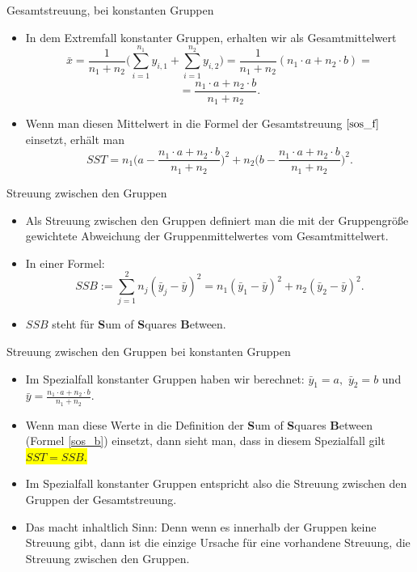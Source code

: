 \documentclass[usenames,dvipsnames,handout]{beamer}
\begin{document}
\begin{frame}{Gesamtstreuung, bei konstanten Gruppen}
\begin{itemize}
\item{In dem Extremfall konstanter Gruppen, erhalten wir als Gesamtmittelwert
 $$\bar{x}=\frac{1}{n_{1}+n_{2}} \bigg(\sum_{i=1}^{n_{1}} y_{i,1} + \sum_{i=1}^{n_{2}} y_{i,2}\bigg)
 =\frac{1}{n_{1}+n_{2}}(n_{1} \cdot a + n_{2} \cdot b) =$$ $$ = \frac{n_{1} \cdot a + n_{2} \cdot b}{n_{1}+n_{2}}.$$
}\pause
\item{Wenn man diesen Mittelwert in die Formel  der Gesamtstreuung $\eqref{sos_f}$  einsetzt, erhält man
\begin{equation}
\label{sos_t} SST=
n_{1}\bigg( a - \frac{n_{1} \cdot a + n_{2} \cdot b}{n_{1}+n_{2}}\bigg)^{2}+
n_{2}\bigg( b - \frac{n_{1} \cdot a + n_{2} \cdot b}{n_{1}+n_{2}}\bigg)^{2}.
\end{equation}
}
\end{itemize}
\end{frame}
\begin{frame}{Streuung zwischen den Gruppen}
\begin{itemize}
\item{Als Streuung zwischen den Gruppen definiert man die mit der Gruppengröße gewichtete Abweichung
der Gruppenmittelwertes vom Gesamtmittelwert.}\pause
\item{In einer Formel:
\begin{equation}
\label{sos_b} 
SSB := \sum_{j=1}^{2}n_{j}(\bar{y}_{j}-\bar{y})^{2}=n_{1}(\bar{y}_{1}-\bar{y})^{2}+
n_{2}(\bar{y}_{2}-\bar{y})^{2}.
\end{equation}
}\pause
\item{$SSB$ steht für \textbf{S}um of \textbf{S}quares \textbf{B}etween.}
\end{itemize}
\end{frame}


\begin{frame}{Streuung zwischen den Gruppen bei konstanten Gruppen}
\begin{itemize}
\item{Im Spezialfall konstanter Gruppen haben wir berechnet: $\bar{y}_{1}=a,$ $\bar{y}_{2}=b$ und 
$\bar{y}=\frac{n_{1} \cdot a + n_{2} \cdot b}{n_{1} + n_{2}}.$}\pause
\item{Wenn man diese Werte  in die Definition der  \textbf{S}um of \textbf{S}quares \textbf{B}etween (Formel \eqref{sos_b}) einsetzt, dann sieht man, dass in diesem Spezialfall gilt \colorbox{yellow}{$SST=SSB.$}}\pause
\item{Im Spezialfall konstanter Gruppen entspricht also die Streuung zwischen den
Gruppen der Gesamtstreuung.}\pause
\item{Das macht inhaltlich Sinn: Denn wenn es innerhalb der Gruppen keine Streuung gibt,
dann ist die einzige Ursache für eine vorhandene Streuung, die Streuung zwischen den Gruppen.}
\end{itemize}
\end{frame}
\end{document}
